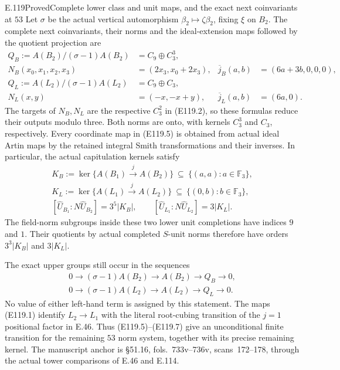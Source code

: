 \begin{statement}{E.119}{Proved}{Complete lower class and unit maps, and the exact next coinvariants at $53$}
Let $\sigma$ be the actual vertical automorphism
$\beta_2\mapsto\zeta\beta_2$, fixing $\xi$ on $B_2$.
The complete next coinvariants, their norms and the ideal-extension
maps followed by the quotient projection are
\[
 \begin{aligned}
 Q_B:=A(B_2)/(\sigma-1)A(B_2)&=C_9\oplus C_3^3,\\
 N_B(x_0,x_1,x_2,x_3)&=(2x_3,x_0+2x_3),&
 \overline j_B(a,b)&=(6a+3b,0,0,0),\\
 Q_L:=A(L_2)/(\sigma-1)A(L_2)&=C_9\oplus C_3,\\
 N_L(x,y)&=(-x,-x+y),&
 \overline j_L(a,b)&=(6a,0).
 \end{aligned}
 \tag{E119.5}
\]
The targets of $N_B,N_L$ are the respective $C_3^2$ in
(E119.2), so these formulas reduce their outputs modulo three.
Both norms are onto, with kernels $C_3^3$ and $C_3$, respectively.
Every coordinate map in (E119.5) is obtained from actual ideal Artin
maps by the retained integral Smith transformations and their inverses.
In particular, the actual capitulation kernels satisfy
\[
 \begin{gathered}
 K_B:=\ker\{A(B_1)\xrightarrow{j}A(B_2)\}
       \ \subseteq\ \{(a,a):a\in\mathbb F_3\},\\
 K_L:=\ker\{A(L_1)\xrightarrow{j}A(L_2)\}
       \ \subseteq\ \{(0,b):b\in\mathbb F_3\},\\
 [\widehat U_{B_1}:N\widehat U_{B_2}]=3^5|K_B|,\qquad
 [\widehat U_{L_1}:N\widehat U_{L_2}]=3|K_L|.
 \end{gathered}
 \tag{E119.6}
\]
The field-norm subgroups inside these two lower unit completions
have indices $9$ and $1$. Their quotients by actual completed
$S$-unit norms therefore have orders $3^3|K_B|$ and $3|K_L|$.

The exact upper groups still occur in the sequences
\[
 \begin{aligned}
 0\longrightarrow(\sigma-1)A(B_2)\longrightarrow A(B_2)
       \longrightarrow Q_B\longrightarrow0,\\
 0\longrightarrow(\sigma-1)A(L_2)\longrightarrow A(L_2)
       \longrightarrow Q_L\longrightarrow0.
 \end{aligned}
 \tag{E119.7}
\]
No value of either left-hand term is assigned by this statement.
The maps (E119.1) identify $L_2\to L_1$ with the literal root-cubing
transition of the $j=1$ positional factor in E.46. Thus (E119.5)--(E119.7)
give an unconditional finite transition for the remaining $53$ norm
system, together with its precise remaining kernel.
The manuscript anchor is \S51.16, fols.~733v--736v,
scans~172--178, through the actual tower comparisons of E.46 and E.114.
\end{statement}

